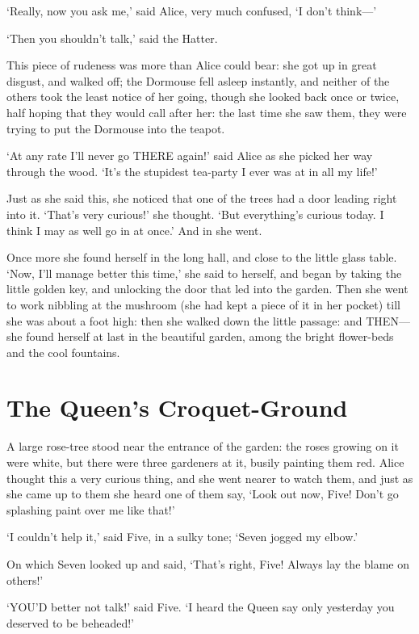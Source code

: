 \documentclass[12pt]{article}
\begin{document}
\begin{Parallel}[p]{}{}
{‘Really, now you ask me,’ said Alice, very much confused, ‘I don’t think—’

‘Then you shouldn’t talk,’ said the Hatter.

This piece of rudeness was more than Alice could bear: she got up in great disgust, and walked off; the Dormouse fell asleep instantly, and neither of the others took the least notice of her going, though she looked back once or twice, half hoping that they would call after her: the last time she saw them, they were trying to put the Dormouse into the teapot.

‘At any rate I’ll never go THERE again!’ said Alice as she picked her way through the wood. ‘It’s the stupidest tea-party I ever was at in all my life!’

Just as she said this, she noticed that one of the trees had a door leading right into it. ‘That’s very curious!’ she thought. ‘But everything’s curious today. I think I may as well go in at once.’ And in she went.

Once more she found herself in the long hall, and close to the little glass table. ‘Now, I’ll manage better this time,’ she said to herself, and began by taking the little golden key, and unlocking the door that led into the garden. Then she went to work nibbling at the mushroom (she had kept a piece of it in her pocket) till she was about a foot high: then she walked down the little passage: and THEN—she found herself at last in the beautiful garden, among the bright flower-beds and the cool fountains.




\section{The Queen’s Croquet-Ground}

A large rose-tree stood near the entrance of the garden: the roses growing on it were white, but there were three gardeners at it, busily painting them red. Alice thought this a very curious thing, and she went nearer to watch them, and just as she came up to them she heard one of them say, ‘Look out now, Five! Don’t go splashing paint over me like that!’

‘I couldn’t help it,’ said Five, in a sulky tone; ‘Seven jogged my elbow.’

On which Seven looked up and said, ‘That’s right, Five! Always lay the blame on others!’

‘YOU’D better not talk!’ said Five. ‘I heard the Queen say only yesterday you deserved to be beheaded!’

}
\end{Parallel}
\end{document}
